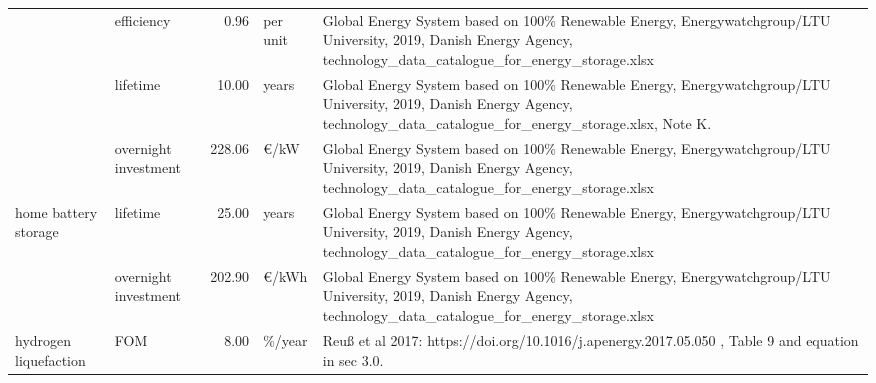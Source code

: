 \begin{longtable}{p{4cm}p{4cm}rp{3cm}p{10cm}}
                      & efficiency &         0.96 &                      per unit &                                                                                                                                                            Global Energy System based on 100\% Renewable Energy, Energywatchgroup/LTU University, 2019, Danish Energy Agency, technology\_data\_catalogue\_for\_energy\_storage.xlsx \\
                      & lifetime &        10.00 &                         years &                                                                                                                                                   Global Energy System based on 100\% Renewable Energy, Energywatchgroup/LTU University, 2019, Danish Energy Agency, technology\_data\_catalogue\_for\_energy\_storage.xlsx, Note K. \\
                      & overnight investment &       228.06 &                      \euro/kW &                                                                                                                                                            Global Energy System based on 100\% Renewable Energy, Energywatchgroup/LTU University, 2019, Danish Energy Agency, technology\_data\_catalogue\_for\_energy\_storage.xlsx \\
home battery storage & lifetime &        25.00 &                         years &                                                                                                                                                            Global Energy System based on 100\% Renewable Energy, Energywatchgroup/LTU University, 2019, Danish Energy Agency, technology\_data\_catalogue\_for\_energy\_storage.xlsx \\
                      & overnight investment &       202.90 &                     \euro/kWh &                                                                                                                                                            Global Energy System based on 100\% Renewable Energy, Energywatchgroup/LTU University, 2019, Danish Energy Agency, technology\_data\_catalogue\_for\_energy\_storage.xlsx \\
hydrogen liquefaction & FOM &         8.00 &                       \%/year &                                                                                                                                                                                                                                   Reuß et al 2017: https://doi.org/10.1016/j.apenergy.2017.05.050 , Table 9 and equation in sec 3.0. \\

\end{longtable}
